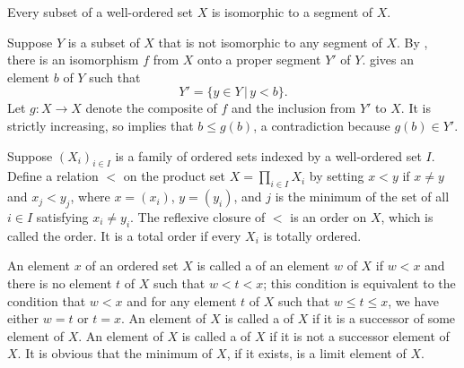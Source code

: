 \documentclass{article}
\begin{document}
\begin{theorem}
  \label{thm:xhbclgwz}
  Every subset of a well-ordered set \(X\) is isomorphic to a segment
  of \(X\).
\end{theorem}

Suppose \(Y\) is a subset of \(X\) that is not isomorphic to any
segment of \(X\).  By , there is an isomorphism
\(f\) from \(X\) onto a proper segment \(Y'\) of \(Y\).
 gives an element \(b\) of \(Y\) such that
\begin{displaymath}
  Y' = \{ y \in Y \,\vert\, y < b \}.
\end{displaymath}
Let \(g : X \to X\) denote the composite of \(f\) and the inclusion
from \(Y'\) to \(X\).  It is strictly increasing, so
 implies that \(b \leq g(b)\), a contradiction
because \(g(b) \in Y'\).

Suppose \((X_i)_{i \in I}\) is a family of ordered sets indexed by a
well-ordered set \(I\).  Define a relation \(<\) on the product set
\(X = \prod_{i \in I} X_i\) by setting \(x < y\) if \(x \neq y\) and
\(x_j < y_j\), where \(x = (x_i)\), \(y = (y_i)\), and \(j\) is the
minimum of the set of all \(i \in I\) satisfying \(x_i \neq y_i\).
The reflexive closure of \(<\) is an order on \(X\), which is called
the  order.  It is a total order if every
\(X_i\) is totally ordered.

An element \(x\) of an ordered set \(X\) is called a
 of an element \(w\) of \(X\) if \(w < x\) and
there is no element \(t\) of \(X\) such that \(w < t < x\); this
condition is equivalent to the condition that \(w < x\) and for any
element \(t\) of \(X\) such that \(w \leq t \leq x\), we have either
\(w = t\) or \(t = x\).  An element of \(X\) is called a
 of \(X\) if it is a successor of some
element of \(X\).  An element of \(X\) is called a  of \(X\) if it is not a successor element of \(X\).  It is
obvious that the minimum of \(X\), if it exists, is a limit element of
\(X\).
\end{document}
